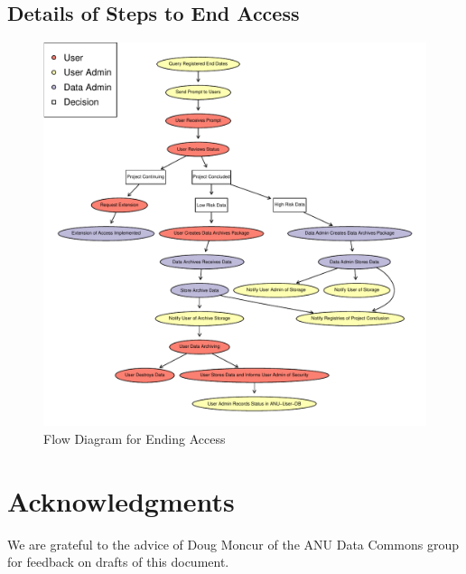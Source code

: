 \documentclass[a4paper]{article}
\begin{document}
\subsection{Details of Steps to End Access}
\label{sec-5-3}



\begin{figure}[!h]
\centering
\includegraphics[width=1.5\textwidth]{DataAccessFlowDiagram-EndAccess.pdf}
\caption{Flow Diagram for Ending Access}
\label{fig:DataAccessFlowDiagram-EndAccess}
\end{figure}
\clearpage
\section{Acknowledgments}
\label{sec-6}

We are grateful to the advice of Doug Moncur of the ANU Data Commons group for feedback on drafts of this document.
\end{document}
